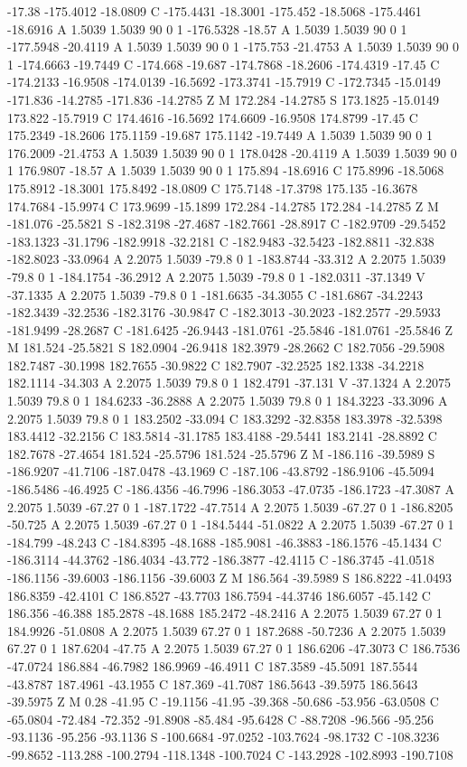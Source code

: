 {{{-17.38 -175.4012 -18.0809 C -175.4431 -18.3001 -175.452 -18.5068 -175.4461 -18.6916 A 1.5039 1.5039 90 0 1 -176.5328 -18.57 A 1.5039 1.5039 90 0 1 -177.5948 -20.4119 A 1.5039 1.5039 90 0 1 -175.753 -21.4753 A 1.5039 1.5039 90 0 1 -174.6663 -19.7449 C -174.668 -19.687 -174.7868 -18.2606 -174.4319 -17.45 C -174.2133 -16.9508 -174.0139 -16.5692 -173.3741 -15.7919 C -172.7345 -15.0149 -171.836 -14.2785 -171.836 -14.2785 Z M 172.284 -14.2785 S 173.1825 -15.0149 173.822 -15.7919 C 174.4616 -16.5692 174.6609 -16.9508 174.8799 -17.45 C 175.2349 -18.2606 175.1159 -19.687 175.1142 -19.7449 A 1.5039 1.5039 90 0 1 176.2009 -21.4753 A 1.5039 1.5039 90 0 1 178.0428 -20.4119 A 1.5039 1.5039 90 0 1 176.9807 -18.57 A 1.5039 1.5039 90 0 1 175.894 -18.6916 C 175.8996 -18.5068 175.8912 -18.3001 175.8492 -18.0809 C 175.7148 -17.3798 175.135 -16.3678 174.7684 -15.9974 C 173.9699 -15.1899 172.284 -14.2785 172.284 -14.2785 Z M -181.076 -25.5821 S -182.3198 -27.4687 -182.7661 -28.8917 C -182.9709 -29.5452 -183.1323 -31.1796 -182.9918 -32.2181 C -182.9483 -32.5423 -182.8811 -32.838 -182.8023 -33.0964 A 2.2075 1.5039 -79.8 0 1 -183.8744 -33.312 A 2.2075 1.5039 -79.8 0 1 -184.1754 -36.2912 A 2.2075 1.5039 -79.8 0 1 -182.0311 -37.1349 V -37.1335 A 2.2075 1.5039 -79.8 0 1 -181.6635 -34.3055 C -181.6867 -34.2243 -182.3439 -32.2536 -182.3176 -30.9847 C -182.3013 -30.2023 -182.2577 -29.5933 -181.9499 -28.2687 C -181.6425 -26.9443 -181.0761 -25.5846 -181.0761 -25.5846 Z M 181.524 -25.5821 S 182.0904 -26.9418 182.3979 -28.2662 C 182.7056 -29.5908 182.7487 -30.1998 182.7655 -30.9822 C 182.7907 -32.2525 182.1338 -34.2218 182.1114 -34.303 A 2.2075 1.5039 79.8 0 1 182.4791 -37.131 V -37.1324 A 2.2075 1.5039 79.8 0 1 184.6233 -36.2888 A 2.2075 1.5039 79.8 0 1 184.3223 -33.3096 A 2.2075 1.5039 79.8 0 1 183.2502 -33.094 C 183.3292 -32.8358 183.3978 -32.5398 183.4412 -32.2156 C 183.5814 -31.1785 183.4188 -29.5441 183.2141 -28.8892 C 182.7678 -27.4654 181.524 -25.5796 181.524 -25.5796 Z M -186.116 -39.5989 S -186.9207 -41.7106 -187.0478 -43.1969 C -187.106 -43.8792 -186.9106 -45.5094 -186.5486 -46.4925 C -186.4356 -46.7996 -186.3053 -47.0735 -186.1723 -47.3087 A 2.2075 1.5039 -67.27 0 1 -187.1722 -47.7514 A 2.2075 1.5039 -67.27 0 1 -186.8205 -50.725 A 2.2075 1.5039 -67.27 0 1 -184.5444 -51.0822 A 2.2075 1.5039 -67.27 0 1 -184.799 -48.243 C -184.8395 -48.1688 -185.9081 -46.3883 -186.1576 -45.1434 C -186.3114 -44.3762 -186.4034 -43.772 -186.3877 -42.4115 C -186.3745 -41.0518 -186.1156 -39.6003 -186.1156 -39.6003 Z M 186.564 -39.5989 S 186.8222 -41.0493 186.8359 -42.4101 C 186.8527 -43.7703 186.7594 -44.3746 186.6057 -45.142 C 186.356 -46.388 185.2878 -48.1688 185.2472 -48.2416 A 2.2075 1.5039 67.27 0 1 184.9926 -51.0808 A 2.2075 1.5039 67.27 0 1 187.2688 -50.7236 A 2.2075 1.5039 67.27 0 1 187.6204 -47.75 A 2.2075 1.5039 67.27 0 1 186.6206 -47.3073 C 186.7536 -47.0724 186.884 -46.7982 186.9969 -46.4911 C 187.3589 -45.5091 187.5544 -43.8787 187.4961 -43.1955 C 187.369 -41.7087 186.5643 -39.5975 186.5643 -39.5975 Z M 0.28 -41.95 C -19.1156 -41.95 -39.368 -50.686 -53.956 -63.0508 C -65.0804 -72.484 -72.352 -91.8908 -85.484 -95.6428 C -88.7208 -96.566 -95.256 -93.1136 -95.256 -93.1136 S -100.6684 -97.0252 -103.7624 -98.1732 C -108.3236 -99.8652 -113.288 -100.2794 -118.1348 -100.7024 C -143.2928 -102.8993 -190.7108 }}}
